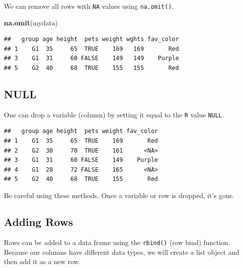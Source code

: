 \documentclass[
]{book}
\newenvironment{Shaded}{\begin{snugshade}}{\end{snugshade}}
\newcommand{\KeywordTok}[1]{\textcolor[rgb]{0.13,0.29,0.53}{\textbf{#1}}}
\newcommand{\NormalTok}[1]{#1}
\newcommand{\OperatorTok}[1]{\textcolor[rgb]{0.81,0.36,0.00}{\textbf{#1}}}
\newcommand{\OtherTok}[1]{\textcolor[rgb]{0.56,0.35,0.01}{#1}}
\newcommand{\StringTok}[1]{\textcolor[rgb]{0.31,0.60,0.02}{#1}}
\begin{document}
We can remove all rows with \texttt{NA} values using \texttt{na.omit()}.

\begin{Shaded}
\begin{Highlighting}[]
\KeywordTok{na.omit}\NormalTok{(mydata)}
\end{Highlighting}
\end{Shaded}

\begin{verbatim}
##   group age height  pets weight wghts fav_color
## 1    G1  35     65  TRUE    169   169       Red
## 3    G1  31     60 FALSE    149   149    Purple
## 5    G2  40     68  TRUE    155   155       Red
\end{verbatim}

\hypertarget{null}{%
\subsection*{NULL}\label{null}}

One can drop a variable (column) by setting it equal to the \texttt{R} value \texttt{NULL}.

\begin{Shaded}
\end{Shaded}

\begin{verbatim}
##   group age height  pets weight fav_color
## 1    G1  35     65  TRUE    169       Red
## 2    G2  30     70  TRUE    161      <NA>
## 3    G1  31     60 FALSE    149    Purple
## 4    G1  28     72 FALSE    165      <NA>
## 5    G2  40     68  TRUE    155       Red
\end{verbatim}

Be careful using these methods. Once a variable or row is dropped, it's gone.

\hypertarget{adding-rows}{%
\subsection*{Adding Rows}\label{adding-rows}}

Rows can be added to a data frame using the \texttt{rbind()} (row bind) function. Because our columns have different data types, we will create a list object and then add it as a new row.
\end{document}
